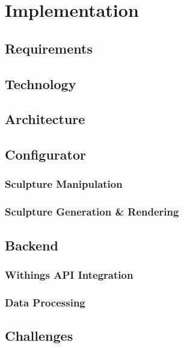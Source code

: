\documentclass[../medieninformatik-arbeit.tex]{subfiles}
\begin{document}
\label{ch:conf}

\section{Implementation}
\subsection{Requirements}
\subsection{Technology}
\subsection{Architecture}
\subsection{Configurator}
\subsubsection{Sculpture Manipulation}
\subsubsection{Sculpture Generation \& Rendering}
\subsection{Backend}
\subsubsection{Withings API Integration}
\subsubsection{Data Processing}
\subsection{Challenges}
\end{document}
